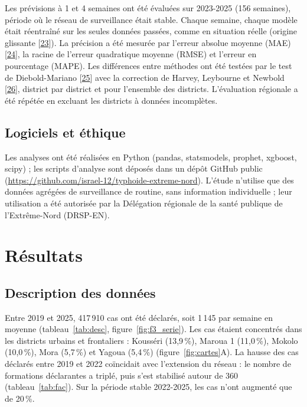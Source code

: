 \documentclass[11pt]{article}
\begin{document}
Les prévisions à 1 et 4 semaines ont été évaluées sur 2023-2025 (156 semaines), période où le réseau de surveillance était stable. Chaque semaine, chaque modèle était réentraîné sur les seules données passées, comme en situation réelle (origine glissante [\hyperlink{ref23}{23}]). La précision a été mesurée par l'erreur absolue moyenne (MAE) [\hyperlink{ref24}{24}], la racine de l'erreur quadratique moyenne (RMSE) et l'erreur en pourcentage (MAPE). Les différences entre méthodes ont été testées par le test de Diebold-Mariano [\hyperlink{ref25}{25}] avec la correction de Harvey, Leybourne et Newbold [\hyperlink{ref26}{26}], district par district et pour l'ensemble des districts. L'évaluation régionale a été répétée en excluant les districts à données incomplètes.

\subsection{Logiciels et éthique}
Les analyses ont été réalisées en Python (pandas, statsmodels, prophet, xgboost, scipy) ; les scripts d'analyse sont déposés dans un dépôt GitHub public (\url{https://github.com/israel-12/typhoide-extreme-nord}). L'étude n'utilise que des données agrégées de surveillance de routine, sans information individuelle ; leur utilisation a été autorisée par la Délégation régionale de la santé publique de l'Extrême-Nord (DRSP-EN).

\section{Résultats}
\subsection{Description des données}
Entre 2019 et 2025, 417\,910 cas ont été déclarés, soit 1\,145 par semaine en moyenne (tableau~\ref{tab:desc}, figure~\ref{fig:f3_serie}). Les cas étaient concentrés dans les districts urbains et frontaliers : Kousséri (13,9\,\%), Maroua 1 (11,0\,\%), Mokolo (10,0\,\%), Mora (5,7\,\%) et Yagoua (5,4\,\%) (figure~\ref{fig:cartes}A). La hausse des cas déclarés entre 2019 et 2022 coïncidait avec l'extension du réseau : le nombre de formations déclarantes a triplé, puis s'est stabilisé autour de 360 (tableau~\ref{tab:fac}). Sur la période stable 2022-2025, les cas n'ont augmenté que de 20\,\%.
\end{document}
